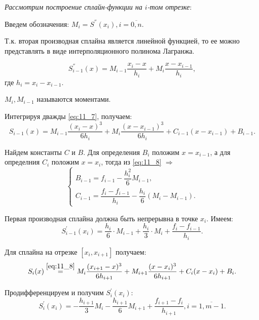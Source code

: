 \textit{Рассмотрим построение сплайн-функции на $i$-том отрезке}:

Введем обозначения: $M_i = S^{''}(x_i), i = \overline{0, n}$.

Т.к. вторая производная сплайна является линейной функцией, то ее можно представлять в виде интерполяционного полинома Лагранжа.

\begin{equation}\label{eq:11_7}
  S^{''}_{i - 1} (x) = M_{i - 1} \dfrac{x_i - x}{h_i} + M_i \dfrac{x - x_{i -1}}{h_i},
\end{equation}
где $h_i = x_i - x_{i - 1}$.

$M_i, M_{i - 1}$ называются моментами.

Интегрируя дважды \eqref{eq:11_7}, получаем:
\begin{equation}\label{eq:11_8}
  S_{i - 1}(x) = M_{i - 1} \dfrac{(x_i - x)^3}{6 h_i} + M_i \dfrac{(x - x_{i-1})^3}{6 h_i} +  C_{i - 1} (x - x_{i - 1}) + B_{i - 1}.
\end{equation}

Найдем константы $C$ и $B$. Для определения $B_i$ положим $x = x_{i - 1}$, а для определния $C_i$ положим $x = x_{i}$, тогда из \eqref{eq:11_8} $\Rightarrow$
\begin{equation*}
  \begin{cases} B_{i - 1} = f_{i - 1} - \dfrac{h_i^2}{6} M_{i - 1}, \\ C_{i - 1} = \dfrac{f_i - f_{i - 1}}{h_i} - \dfrac{h_i}{6}(M_i - M_{i - 1}). \end{cases}
\end{equation*}

Первая производная сплайна должна быть непрерывна в точке $x_i$. Имеем:
\begin{equation}\label{eq:11_9}
  S^{'}_{i - 1}(x_i) = \dfrac{h_i}{6} \cdot M_{i - 1} + \dfrac{h_i}{3} \cdot M_i + \dfrac{f_i - f_{i - 1}}{h_i}.
\end{equation}

Для сплайна на отрезке $[x_i, x_{i+1}]$ получаем:
\begin{equation*}
  S_{i}(x) \overset{\eqref{eq:11_8}}{=} M_i \dfrac{(x_{i+1} - x)^3}{6 h_{i+1}} + M_{i+1} \dfrac{(x - x_i)^3}{6 h_{i+1}} +  C_i (x - x_i) + B_i.
\end{equation*}

Продифференцируем и получим $S^{'}_{i}(x_i)$:
\begin{equation}\label{eq:11_10}
  S^{'}_{i}(x_i) = - \dfrac{h_{i+1}}{3} M_{i}  - \dfrac{h_{i+1}}{6} M_{i+1} + \dfrac{f_{i+1} - f_i}{h_{i+1}}, i = \overline{1, m - 1}.
\end{equation}

